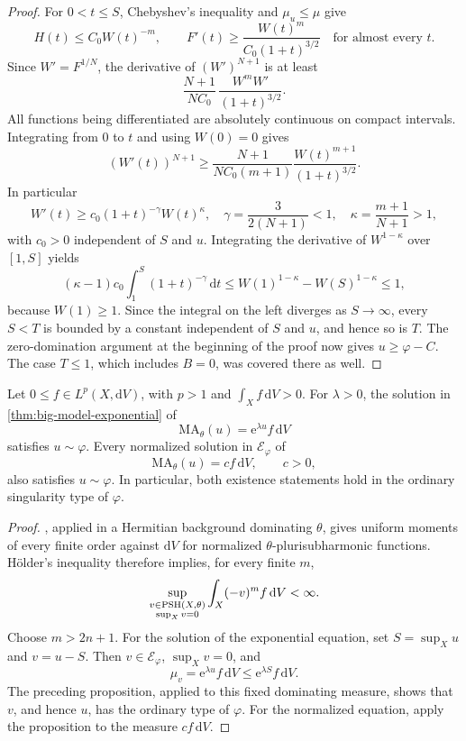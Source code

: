 \begin{proof}
For $0<t\leq S$, Chebyshev's inequality and $\mu_u\leq\mu$ give
\[
 H(t)\leq C_0W(t)^{-m},
 \qquad
 F'(t)\geq\frac{W(t)^m}{C_0(1+t)^{3/2}}
 \quad\text{for almost every }t.
\]
Since $W'=F^{1/N}$, the derivative of $(W')^{N+1}$ is at least
\[
 \frac{N+1}{NC_0}\,
 \frac{W^mW'}{(1+t)^{3/2}}.
\]
All functions being differentiated are absolutely continuous on compact intervals. Integrating from $0$ to $t$ and using $W(0)=0$ gives
\[
 (W'(t))^{N+1}
 \geq\frac{N+1}{NC_0(m+1)}
        \frac{W(t)^{m+1}}{(1+t)^{3/2}}.
\]
In particular
\[
 W'(t)\geq c_0(1+t)^{-\gamma}W(t)^\kappa,
 \quad
 \gamma=\frac{3}{2(N+1)}<1,\quad
 \kappa=\frac{m+1}{N+1}>1,
\]
with $c_0>0$ independent of $S$ and $u$. Integrating the derivative of $W^{1-\kappa}$ over $[1,S]$ yields
\[
 (\kappa-1)c_0\int_1^S(1+t)^{-\gamma}\,\mathrm{d}t
 \leq W(1)^{1-\kappa}-W(S)^{1-\kappa}\leq1,
\]
because $W(1)\geq1$. Since the integral on the left diverges as $S\to\infty$, every $S<T$ is bounded by a constant independent of $S$ and $u$, and hence so is $T$. The zero-domination argument at the beginning of the proof now gives $u\geq\varphi-C$. The case $T\leq1$, which includes $B=0$, was covered there as well.
\end{proof}

\enlargethispage{8\baselineskip}
\begin{corollary}\label{cor:big-model-lp-type}
Let $0\leq f\in L^p(X,\mathrm{d}V)$, with $p>1$ and $\int_Xf\,\mathrm{d}V>0$.
For $\lambda>0$, the solution in \cref{thm:big-model-exponential} of
\[
 \mathrm{MA}_\theta(u)=\mathrm{e}^{\lambda u}f\,\mathrm{d}V
\]
satisfies $u\sim\varphi$. Every normalized solution in $\mathcal E_\varphi$ of
\[
 \mathrm{MA}_\theta(u)=cf\,\mathrm{d}V,\qquad c>0,
\]
also satisfies $u\sim\varphi$. In particular, both existence statements hold in the ordinary singularity type of $\varphi$.
\end{corollary}
\begin{proof}
, applied in a Hermitian background dominating $\theta$, gives uniform moments of every finite order against $\mathrm{d}V$ for normalized $\theta$-plurisubharmonic functions. H\"older's inequality therefore implies, for every finite $m$,
\[
 \sup_{\substack{v\in\mathrm{PSH}(X,\theta)\\\sup_Xv=0}}
       \int_X(-v)^m f\,\mathrm{d}V<\infty.
\]
Choose $m>2n+1$. For the solution of the exponential equation, set $S=\sup_Xu$ and $v=u-S$. Then $v\in\mathcal E_\varphi$, $\sup_Xv=0$, and
\[
 \mu_v=\mathrm{e}^{\lambda u}f\,\mathrm{d}V
 \leq \mathrm{e}^{\lambda S}f\,\mathrm{d}V.
\]
The preceding proposition, applied to this fixed dominating measure, shows that $v$, and hence $u$, has the ordinary type of $\varphi$. For the normalized equation, apply the proposition to the measure $cf\,\mathrm{d}V$.
\end{proof}

